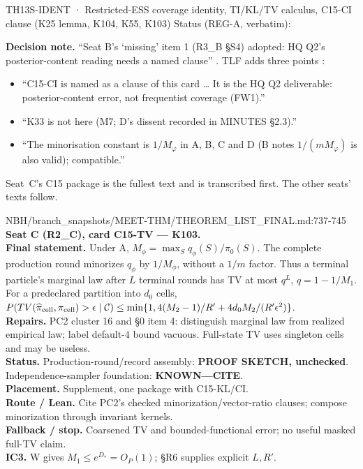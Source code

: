 \begin{card}{TH13}{S-IDENT · Restricted-ESS coverage identity, TI/KL/TV calculus, C15-CI clause (K25 lemma, K104, K55, K103)}
\approvedFB\quad Status (REG-A, verbatim):  

\textbf{Decision note.} ``Seat B's `missing' item 1 (R3\_B §S4) adopted: HQ Q2's posterior-content reading needs a named clause'' . TLF adds three points :
\begin{itemize}
\item ``C15-CI is named as a clause of this card \ldots{} It is the HQ Q2 deliverable: posterior-content error, not frequentist coverage (FW1).''
\item ``K33 is not here (M7; D's dissent recorded in MINUTES §2.3).''
\item ``The minorisation constant is $1/M_φ$ in A, B, C and D (B notes $1/(mM_φ)$ is also valid); compatible.''
\end{itemize}
Seat~C's C15 package is the fullest text and is transcribed first. The other seats' texts follow.

\begin{stmt}{NBH/branch_snapshots/MEET-THM/THEOREM_LIST_FINAL.md:737-745}
\textbf{Seat C (R2\_C), card C15-TV — K103.}\\
\textbf{Final statement.} Under A, $M_\phi=\max_Sq_\phi(S)/\pi_0(S)$. The complete production round minorizes $q_\phi$ by $1/M_\phi$, without a $1/m$ factor. Thus a terminal particle’s marginal law after $L$ terminal rounds has TV at most $q^L$, $q=1-1/M_1$. For a predeclared partition into $d_0$ cells, $P(TV(\widehat\pi_{\rm cell},\pi_{\rm cell})>\epsilon\mid\mathcal C)\le\min\{1,4(M_2-1)/R'+4d_0M_2/(R'\epsilon^2)\}$.\\
\textbf{Repairs.} PC2 cluster 16 and §0 item 4: distinguish marginal law from realized empirical law; label default-$4$ bound vacuous. Full-state TV uses singleton cells and may be useless.\\
\textbf{Status.} Production-round/record assembly: \textbf{PROOF SKETCH, unchecked}. Independence-sampler foundation: \textbf{KNOWN—CITE}.\\
\textbf{Placement.} Supplement, one package with C15-KL/CI.\\
\textbf{Route / Lean.} Cite PC2’s checked minorization/vector-ratio clauses; compose minorization through invariant kernels.\\
\textbf{Fallback / stop.} Coarsened TV and bounded-functional error; no useful masked full-TV claim.\\
\textbf{IC3.} W gives $M_1\le e^{D_*}=O_P(1)$; §R6 supplies explicit $L,R'$.
\end{stmt}


\end{card}
